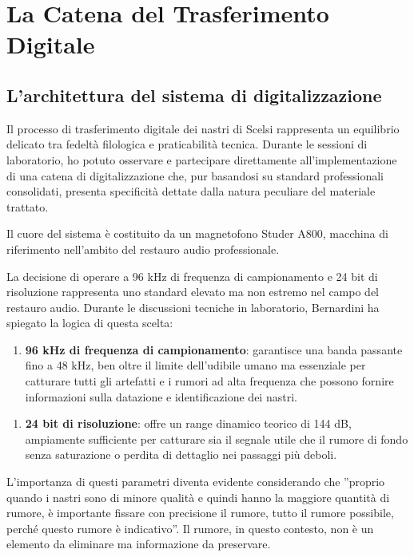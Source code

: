 
\section{La Catena del Trasferimento Digitale}
\subsection{L'architettura del sistema di digitalizzazione}
Il processo di trasferimento digitale dei nastri di Scelsi rappresenta un equilibrio delicato tra fedeltà filologica e praticabilità tecnica. Durante le sessioni di laboratorio, ho potuto osservare e partecipare direttamente all'implementazione di una catena di digitalizzazione che, pur basandosi su standard professionali consolidati, presenta specificità dettate dalla natura peculiare del materiale trattato.

Il cuore del sistema è costituito da un magnetofono Studer A800, macchina di riferimento nell'ambito del restauro audio professionale.

La decisione di operare a 96 kHz di frequenza di campionamento e 24 bit di risoluzione rappresenta uno standard elevato ma non estremo nel campo del restauro audio\cite[p. 172]{Bernardini2007recoveringgia}. Durante le discussioni tecniche in laboratorio, Bernardini ha spiegato la logica di questa scelta:

\begin{enumerate}
    \item \textbf{96 kHz di frequenza di campionamento}: garantisce una banda passante fino a 48 kHz, ben oltre il limite dell'udibile umano ma essenziale per catturare tutti gli artefatti e i rumori ad alta frequenza che possono fornire informazioni sulla datazione e identificazione dei nastri.
\end{enumerate}

\begin{enumerate}
    \item \textbf{24 bit di risoluzione}: offre un range dinamico teorico di 144 dB, ampiamente sufficiente per catturare sia il segnale utile che il rumore di fondo senza saturazione o perdita di dettaglio nei passaggi più deboli.
\end{enumerate}

L'importanza di questi parametri diventa evidente considerando che ''proprio quando i nastri sono di minore qualità e quindi hanno la maggiore quantità di rumore, è importante fissare con precisione il rumore, tutto il rumore possibile, perché questo rumore è indicativo''. Il rumore, in questo contesto, non è un elemento da eliminare ma informazione da preservare.
